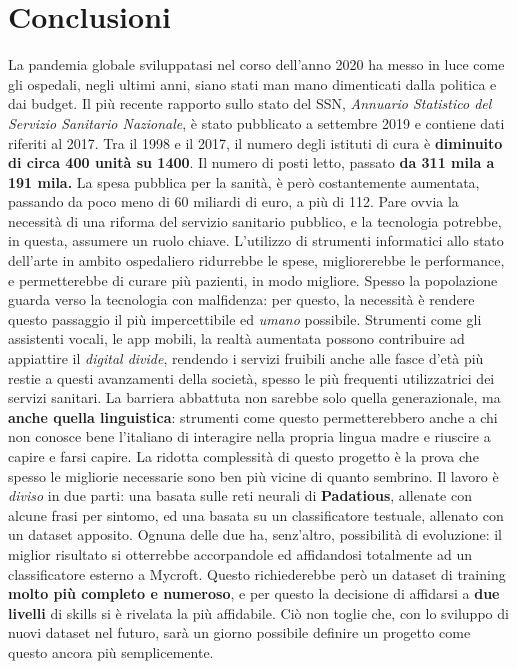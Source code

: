 \chapter{Conclusioni}
\label{chap:conclusioni}
La pandemia globale sviluppatasi nel corso dell'anno 2020 ha messo in luce come gli ospedali, negli ultimi anni, siano stati man mano dimenticati dalla politica e dai budget. Il più recente rapporto sullo stato del SSN, \textit{Annuario Statistico del Servizio Sanitario Nazionale}, è stato pubblicato a settembre 2019 e contiene dati riferiti al 2017.
Tra il 1998 e il 2017, il numero degli istituti di cura è \textbf{diminuito di circa 400 unità su 1400}. Il numero di posti letto, passato \textbf{da 311 mila a 191 mila.} La spesa pubblica per la sanità, è però costantemente aumentata, passando da poco meno di 60 miliardi di euro, a più di 112. \cite{article:tagli-ospedali} Pare ovvia la necessità di una riforma del servizio sanitario pubblico, e la tecnologia potrebbe, in questa, assumere un ruolo chiave. L'utilizzo di strumenti informatici allo stato dell'arte in ambito ospedaliero ridurrebbe le spese, migliorerebbe le performance, e permetterebbe di curare più pazienti, in modo migliore.
Spesso la popolazione guarda verso la tecnologia con malfidenza: per questo, la necessità è rendere questo passaggio il più impercettibile ed \textit{umano} possibile. Strumenti come gli assistenti vocali, le app mobili, la realtà aumentata possono contribuire ad appiattire il \textit{digital divide}, rendendo i servizi fruibili anche alle fasce d'età più restie a questi avanzamenti della società, spesso le più frequenti utilizzatrici dei servizi sanitari.
La barriera abbattuta non sarebbe solo quella generazionale, ma \textbf{anche quella linguistica}: strumenti come questo permetterebbero anche a chi non conosce bene l'italiano di interagire nella propria lingua madre e riuscire a capire e farsi capire.
La ridotta complessità di questo progetto è la prova che spesso le migliorie necessarie sono ben più vicine di quanto sembrino.
Il lavoro è \textit{diviso} in due parti: una basata sulle reti neurali di \textbf{Padatious}, allenate con alcune frasi per sintomo, ed una basata su un classificatore testuale, allenato con un dataset apposito. Ognuna delle due ha, senz'altro, possibilità di evoluzione: il miglior risultato si otterrebbe accorpandole ed affidandosi totalmente ad un classificatore esterno a Mycroft. Questo richiederebbe però un dataset di training \textbf{molto più completo e numeroso}, e per questo la decisione di affidarsi a \textbf{due livelli} di skills si è rivelata la più affidabile. Ciò non toglie che, con lo sviluppo di nuovi dataset nel futuro, sarà un giorno possibile definire un progetto come questo ancora più semplicemente.
